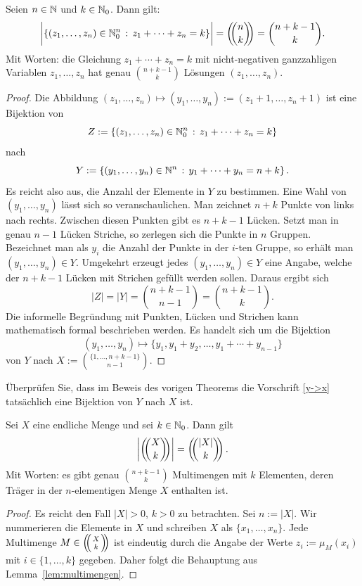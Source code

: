 \begin{lem} \label{lem:multimengen}
	Seien $n \in \mathbb{N}$ und $k \in \mathbb{N}_0$. Dann gilt: 
	\[
		\biggl| \left\{  (z_1,\ldots,z_n) \in \mathbb{N}_0^n \,:\, z_1 + \cdots + z_n = k \right\} \biggr| = \left(\!\!\binom{n}{k}\!\!\right) = \binom{n+k-1}{k}. 
	\]
	Mit Worten: die Gleichung $z_1 + \cdots + z_n = k$ mit nicht-negativen ganzzahligen Variablen $z_1,\ldots,z_n$ hat genau $\binom{n+k-1}{k}$ Lösungen $(z_1,\ldots,z_n)$. 
\end{lem} 
\begin{proof} 
	Die Abbildung $(z_1,\ldots,z_n) \mapsto (y_1,\ldots,y_n):=(z_1+1,\ldots,z_n+1)$ ist eine Bijektion von 
	\[
			Z:=\left\{  (z_1,\ldots,z_n) \in \mathbb{N}_0^n \,:\, z_1 + \cdots + z_n = k \right\}
	\]
	nach 
	\[
			Y:= \left\{  (y_1,\ldots,y_n) \in \mathbb{N}^n \,:\, y_1 + \cdots + y_n = n+ k \right\}. 
	\]
	Es reicht also aus, die Anzahl der Elemente in $Y$ zu bestimmen. Eine Wahl von $(y_1,\ldots,y_n)$ lässt sich so veranschaulichen. Man zeichnet $n+k$ Punkte von links nach rechts. Zwischen diesen Punkten gibt es $n+k-1$ Lücken. Setzt man in genau $n-1$ Lücken Striche, so zerlegen sich die Punkte in $n$ Gruppen. Bezeichnet man als $y_i$ die Anzahl der Punkte in der $i$-ten Gruppe, so erhält man $(y_1,\ldots,y_n) \in Y$. Umgekehrt erzeugt jedes $(y_1,\ldots,y_n) \in Y$ eine Angabe, welche der $n+k-1$ Lücken mit Strichen gefüllt werden sollen. Daraus ergibt sich 
	\[
			|Z| = |Y|= \binom{n+k-1}{n-1} = \binom{n+k-1}{k}. 
	\]
	Die informelle Begründung mit Punkten, Lücken und Strichen kann mathematisch formal beschrieben werden. Es handelt sich um die Bijektion 
	\begin{equation}\label{y->x}
		(y_1,\ldots,y_n) \mapsto \{y_1,y_1+y_2,\ldots, y_1+ \cdots +y_{n-1}\}
	\end{equation}
	 von $Y$ nach 
	\(
			X:=\binom{\{1,\ldots,n+k-1\}}{n-1}. 
	\)
\end{proof} 

\begin{aufg}
	Überprüfen Sie, dass im Beweis des vorigen Theorems die Vorschrift \eqref{y->x} tatsächlich eine Bijektion von $Y$ nach $X$ ist. 
\end{aufg} 

\begin{thm}
	Sei $X$ eine endliche Menge und sei $k \in \mathbb{N}_0$. Dann gilt 
	\[
			\left| \mbinom{X}{k} \right| = \mbinom{|X|}{k}. 
	\]
	Mit Worten: es gibt genau $\binom{n+k-1}{k}$ Multimengen mit $k$ Elementen, deren Träger in der $n$-elementigen Menge $X$ enthalten ist. 
\end{thm}
\begin{proof}
	Es reicht den Fall $|X| >0$, $k>0$ zu betrachten. Sei $n:= |X|$. Wir nummerieren die Elemente in $X$ und schreiben $X$ als $\{x_1,\ldots,x_n\}$. Jede Multimenge $M \in \multiset{X}{k}$ ist eindeutig durch die Angabe der Werte $z_i := \mu_M(x_i)$ mit $i \in \{1,\ldots,k\}$ gegeben. Daher folgt die Behauptung aus Lemma~\ref{lem:multimengen}. 
\end{proof} 

